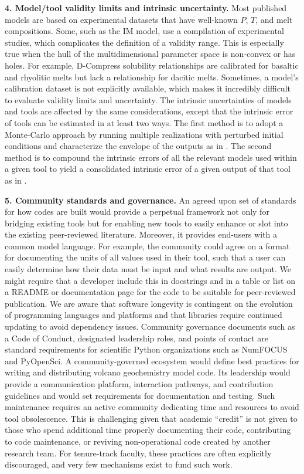 \documentclass[draft, english]{volcanica-template}
\begin{document}
\textbf{4. Model/tool validity limits and intrinsic uncertainty.} Most published models are based on experimental datasets that have well-known $P$, $T$, and melt compositions. Some, such as the IM model, use a compilation of experimental studies, which complicates the definition of a validity range. This is especially true when the hull of the multidimensional parameter space is non-convex or has holes. For example, D-Compress solubility relationships are calibrated for basaltic and rhyolitic melts but lack a relationship for dacitic melts. Sometimes, a model's calibration dataset is not explicitly available, which makes it incredibly difficult to evaluate validity limits and uncertainty. The intrinsic uncertainties of models and tools are affected by the same considerations, except that the intrinsic error of tools can be estimated in at least two ways. The first method is to adopt a Monte-Carlo approach by running multiple realizations with perturbed initial conditions and characterize the envelope of the outputs as in \textcite{hughes2026evaluation}. The second method is to compound the intrinsic errors of all the relevant models used within a given tool to yield a consolidated intrinsic error of a given output of that tool as in \textcite{Burgisser2015}. 

\textbf{5. Community standards and governance.} An agreed upon set of standards for how codes are built would provide a perpetual framework not only for bridging existing tools but for enabling new tools to easily enhance or slot into the existing peer-reviewed literature. Moreover, it provides end-users with a common model language. For example, the community could agree on a format for documenting the units of all values used in their tool, such that a user can easily determine how their data must be input and what results are output. We might require that a developer include this in docstrings and in a table or list on a README or documentation page for the code to be suitable for peer-reviewed publication. We are aware that software longevity is contingent on the evolution of programming languages and platforms and that libraries require continued updating to avoid dependency issues. Community governance documents such as a Code of Conduct, designated leadership roles, and points of contact are standard requirements for scientific Python organizations such as NumFOCUS and PyOpenSci. A community-governed ecosystem would define best practices for writing and distributing volcano geochemistry model code. Its leadership would provide a communication platform, interaction pathways, and contribution guidelines and would set requirements for documentation and testing. Such maintenance requires an active community dedicating time and resources to avoid tool obsolescence. This is challenging given that academic ``credit'' is not given to those who spend additional time properly documenting their code, contributing to code maintenance, or reviving non-operational code created by another research team. For tenure-track faculty, these practices are often explicitly discouraged, and very few mechanisms exist to fund such work. 
\end{document}
